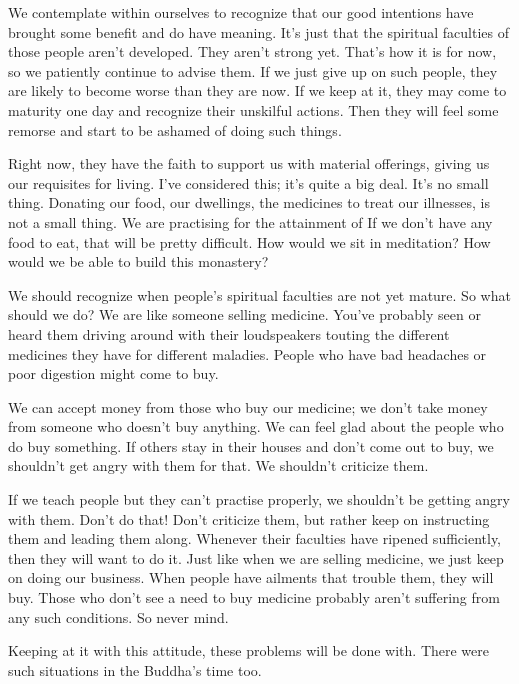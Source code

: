 We contemplate within ourselves to recognize that our good intentions have brought some benefit and do have meaning. It's just that the spiritual faculties of those people aren't developed. They aren't strong yet. That's how it is for now, so we patiently continue to advise them. If we just give up on such people, they are likely to become worse than they are now. If we keep at it, they may come to maturity one day and recognize their unskilful actions. Then they will feel some remorse and start to be ashamed of doing such things.

Right now, they have the faith to support us with material offerings, giving us our requisites for living. I've considered this; it's quite a big deal. It's no small thing. Donating our food, our dwellings, the medicines to treat our illnesses, is not a small thing. We are practising for the attainment of  If we don't have any food to eat, that will be pretty difficult. How would we sit in meditation? How would we be able to build this monastery?

We should recognize when people's spiritual faculties are not yet mature. So what should we do? We are like someone selling medicine. You've probably seen or heard them driving around with their loudspeakers touting the different medicines they have for different maladies. People who have bad headaches or poor digestion might come to buy.

We can accept money from those who buy our medicine; we don't take money from someone who doesn't buy anything. We can feel glad about the people who do buy something. If others stay in their houses and don't come out to buy, we shouldn't get angry with them for that. We shouldn't criticize them.

If we teach people but they can't practise properly, we shouldn't be getting angry with them. Don't do that! Don't criticize them, but rather keep on instructing them and leading them along. Whenever their faculties have ripened sufficiently, then they will want to do it. Just like when we are selling medicine, we just keep on doing our business. When people have ailments that trouble them, they will buy. Those who don't see a need to buy medicine probably aren't suffering from any such conditions. So never mind. 

Keeping at it with this attitude, these problems will be done with. There were such situations in the Buddha's time too. 

